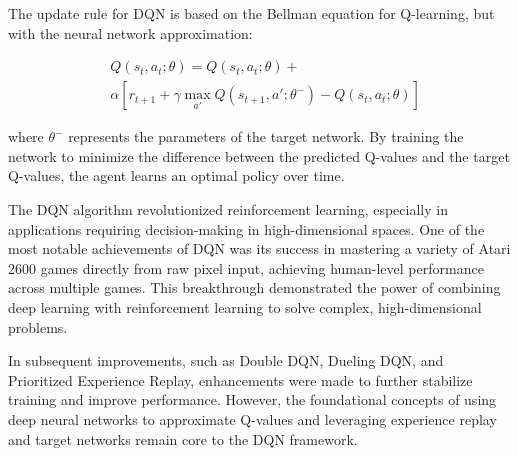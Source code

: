 The update rule for DQN is based on the Bellman equation for Q-learning, but
with the neural network approximation:

\begin{equation}
    \begin{split}
         & Q(s_t, a_t; \theta) = Q(s_t, a_t; \theta) +                                                     \\
         & \alpha \left[ r_{t+1} + \gamma \max_{a'} Q(s_{t+1}, a'; \theta^-) - Q(s_t, a_t; \theta) \right]
    \end{split}
\end{equation}

where \( \theta^- \) represents the parameters of the target network. By
training the network to minimize the difference between the predicted Q-values
and the target Q-values, the agent learns an optimal policy over
time.\cite{bg4}

The DQN algorithm revolutionized reinforcement learning, especially in
applications requiring decision-making in high-dimensional spaces. One of the
most notable achievements of DQN was its success in mastering a variety of
Atari 2600 games directly from raw pixel input, achieving human-level
performance across multiple games. This breakthrough demonstrated the power of
combining deep learning with reinforcement learning to solve complex,
high-dimensional problems.

In subsequent improvements, such as Double DQN, Dueling DQN, and Prioritized
Experience Replay, enhancements were made to further stabilize training and
improve performance. However, the foundational concepts of using deep neural
networks to approximate Q-values and leveraging experience replay and target
networks remain core to the DQN framework.
